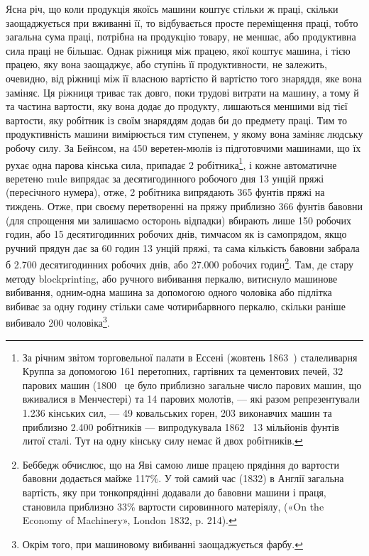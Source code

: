 Ясна річ, що коли продукція якоїсь машини коштує стільки ж
праці, скільки заощаджується при вживанні її, то відбувається
просте переміщення праці, тобто загальна сума праці, потрібна
на продукцію товару, не меншає, або продуктивна сила праці не
більшає. Однак ріжниця між працею, якої коштує машина, і
тією працею, яку вона заощаджує, або ступінь її продуктивности,
не залежить, очевидно, від ріжниці між її власною вартістю й
вартістю того знаряддя, яке вона заміняє. Ця ріжниця триває
так довго, поки трудові витрати на машину, а тому й та частина
вартости, яку вона додає до продукту, лишаються меншими від
тієї вартости, яку робітник із своїм знаряддям додав би до предмету
праці. Тим то продуктивність машини вимірюється тим
ступенем, у якому вона заміняє людську робочу силу. За Бейнсом,
на 450 веретен-мюлів із підготовчими машинами, що їх рухає
одна парова кінська сила, припадає 2 робітника\footnote{
За річним звітом торговельної палати в Ессені (жовтень 1863~)
сталеливарня Круппа за допомогою 161 перетопних, гартівних та цементових
печей, 32 парових машин (1800~ це було приблизно загальне число
парових машин, що вживалися в Менчестері) та 14 парових молотів, —
які разом репрезентували \num{1.236} кінських сил, — 49 ковальських горен,
203 виконавчих машин та приблизно \num{2.400} робітників — випродукувала
1862~ 13 мільйонів фунтів литої сталі. Тут на одну кінську силу немає
й двох робітників.
}, і кожне
автоматичне веретено mule випрядає за десятигодинного робочого
дня 13 унцій пряжі (пересічного нумера), отже, 2 робітника
випрядають 365 фунтів пряжі на тиждень. Отже, при своєму
перетворенні на пряжу приблизно 366 фунтів бавовни (для спрощення
ми залишаємо осторонь відпадки) вбирають лише 150 робочих
годин, або 15 десятигодинних робочих днів, тимчасом як із
самопрядом, якщо ручний прядун дає за 60 годин 13 унцій пряжі,
та сама кількість бавовни забрала б \num{2.700} десятигодинних робочих
днів, або \num{27.000} робочих годин\footnote{
Беббедж обчислює, що на Яві самою лише працею прядіння до
вартости бавовни додається майже 117\%. У той самий час (1832) в Англії
загальна вартість, яку при тонкопрядінні додавали до бавовни машини
і праця, становила приблизно 33\% вартости сировинного матеріялу,
(«On the Economy of Machinery», London 1832, p. 214).
}. Там, де стару методу
blockprinting, або ручного вибивання перкалю, витиснуло машинове
вибивання, одним-одна машина за допомогою одного чоловіка
або підлітка вибиває за одну годину стільки саме чотирибарвного
перкалю, скільки раніше вибивало 200 чоловіка\footnote{
Окрім того, при машиновому вибиванні заощаджується фарбу.
}.
\parbreak{}  %
